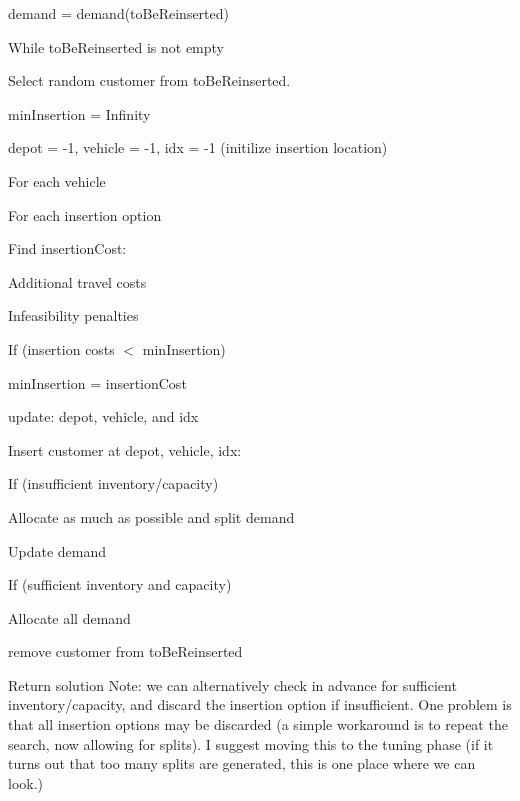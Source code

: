 \begin{DoxyEnumerate}
\item demand = demand(to\+Be\+Reinserted)
\item While to\+Be\+Reinserted is not empty
\begin{DoxyItemize}
\item Select random customer from to\+Be\+Reinserted.
\item min\+Insertion = Infinity
\item depot = -\/1, vehicle = -\/1, idx = -\/1 (initilize insertion location)
\item For each vehicle
\begin{DoxyItemize}
\item For each insertion option
\begin{DoxyItemize}
\item Find insertion\+Cost\+:
\begin{DoxyItemize}
\item Additional travel costs
\item Infeasibility penalties
\end{DoxyItemize}
\item If (insertion costs $<$ min\+Insertion)
\begin{DoxyItemize}
\item min\+Insertion = insertion\+Cost
\item update\+: depot, vehicle, and idx
\end{DoxyItemize}
\end{DoxyItemize}
\end{DoxyItemize}
\item Insert customer at depot, vehicle, idx\+:
\item If (insufficient inventory/capacity)
\begin{DoxyItemize}
\item Allocate as much as possible and split demand
\item Update demand
\end{DoxyItemize}
\item If (sufficient inventory and capacity)
\begin{DoxyItemize}
\item Allocate all demand
\item remove customer from to\+Be\+Reinserted
\end{DoxyItemize}
\end{DoxyItemize}
\item Return solution Note\+: we can alternatively check in advance for sufficient inventory/capacity, and discard the insertion option if insufficient. One problem is that all insertion options may be discarded (a simple workaround is to repeat the search, now allowing for splits). I suggest moving this to the tuning phase (if it turns out that too many splits are generated, this is one place where we can look.)
\end{DoxyEnumerate}

